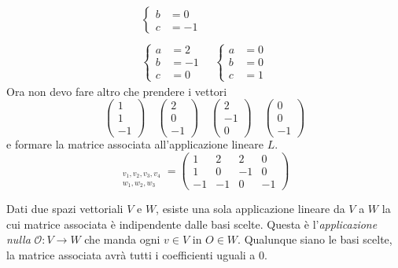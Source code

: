 \begin{example}
\begin{gather*}
\begin{cases}
			b & = 0  \\
			c & = -1
		\end{cases} \\
		\\
		\begin{cases}
			a & = 2  \\
			b & = -1 \\
			c & = 0
		\end{cases}
		\quad
		\begin{cases}
			a & = 0 \\
			b & = 0 \\
			c & = 1
		\end{cases}
	\end{gather*}
	Ora non devo fare altro che prendere i vettori
	\begin{equation*}
		\begin{pmatrix}
			1 \\ 1 \\ -1
		\end{pmatrix}
		\quad
		\begin{pmatrix}
			2 \\ 0 \\ -1
		\end{pmatrix}
		\quad
		\begin{pmatrix}
			2 \\ -1 \\ 0
		\end{pmatrix}
		\quad
		\begin{pmatrix}
			0 \\ 0 \\ -1
		\end{pmatrix}
	\end{equation*}
	e formare la matrice associata all'applicazione lineare $L$.
	\begin{equation*}
		[L]_{\substack{v_1, v_2, v_3, v_4 \\
				w_1, w_2, w_3}} =
		\begin{pmatrix}
			1  & 2  & 2  & 0  \\
			1  & 0  & -1 & 0  \\
			-1 & -1 & 0  & -1
		\end{pmatrix}
	\end{equation*}
\end{example}

\begin{observation}
	Dati due spazi vettoriali $V$ e $W$, esiste una sola applicazione
	lineare da $V$ a $W$ la cui matrice associata \`e indipendente dalle
	basi scelte. Questa \`e l'\emph{applicazione nulla}
	$\mathcal{O} : V \rightarrow W$ che manda ogni $v \in V$ in $O \in W$.
	Qualunque siano le basi scelte, la matrice associata avr\`a tutti
	i coefficienti uguali a $0$.
\end{observation}

